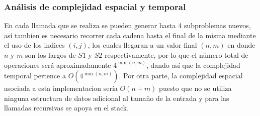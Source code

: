 \subsubsection{Análisis de complejidad espacial y temporal}

    En cada llamada que se realiza se pueden generar hasta 4 subproblemas nuevos, así tambien es necesario recorrer cada cadena hasta el final de la misma mediante 
    el uso de los indices $(i,j)$, los cuales llegaran a un valor final $(n,m)$ en donde $n$ y $m$ son los largos de $S1$ y $S2$ respectivamente, por lo que el 
    número total de operaciones será aproximadamente $4^{\min(n,m)}$, dando así que la complejidad temporal pertence a $O(4^{\min(n,m)})$. Por otra parte,
    la complejidad espacial asociada a esta implementacion sería $O(n + m)$ puesto que no se utiliza ninguna estructura de datos adicional al tamaño de la entrada y
    para las llamadas recursivas se apoya en el stack.

